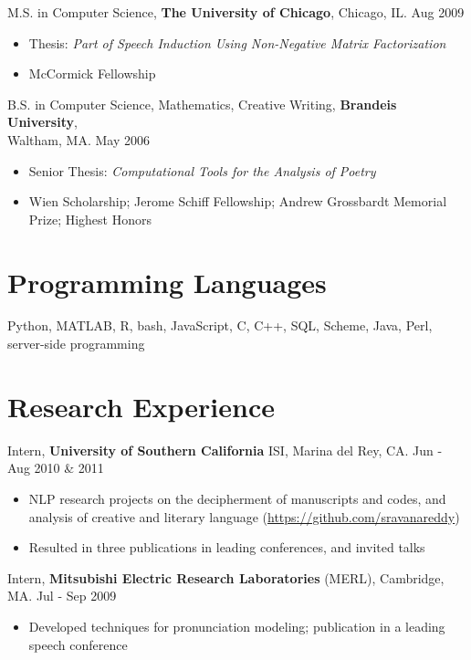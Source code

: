 \documentclass{res}
\begin{document}
\begin{resume}
M.S. in Computer Science, {\bf The University of Chicago}, Chicago, IL. \hfill Aug 2009 
\begin{itemize}[noitemsep]
\item Thesis: {\em Part of Speech Induction Using Non-Negative Matrix Factorization}
\item McCormick Fellowship
\end{itemize}

B.S. in Computer Science, Mathematics, Creative Writing, {\bf Brandeis University}, \\Waltham, MA. \hfill May 2006
\begin{itemize}[noitemsep]
\item Senior Thesis: {\em Computational Tools for the Analysis of Poetry}
\item Wien Scholarship; Jerome Schiff Fellowship; Andrew Grossbardt Memorial Prize; Highest Honors
\end{itemize}

\section{Programming Languages}

Python, MATLAB, R, bash, JavaScript, C, C++, SQL, Scheme, Java, Perl, server-side programming



\section{Research Experience}
Intern, {\bf University of Southern California} ISI, Marina del Rey, CA.  \hfill Jun - Aug 2010 \& 2011 
\begin{itemize}[noitemsep]
\item NLP research projects on the decipherment of  manuscripts and codes,
and analysis of creative and literary language (\url{https://github.com/sravanareddy})
\item Resulted in three publications in leading conferences, and invited talks
\end{itemize}

Intern, {\bf Mitsubishi Electric Research Laboratories} (MERL), Cambridge, MA.  \hfill  Jul - Sep 2009
\begin{itemize}[noitemsep]
\item Developed techniques for pronunciation modeling; publication in a leading speech conference
\end{itemize}


\end{resume}
\end{document}

